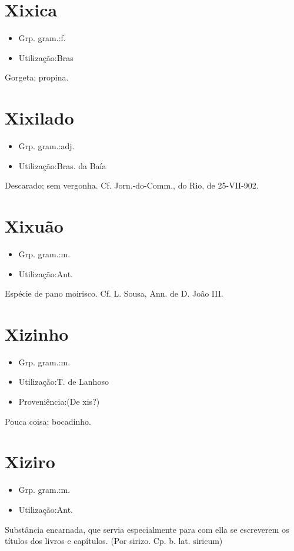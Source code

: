 \section{Xixica}
\begin{itemize}
\item {Grp. gram.:f.}
\end{itemize}
\begin{itemize}
\item {Utilização:Bras}
\end{itemize}
Gorgeta; propina.
\section{Xixilado}
\begin{itemize}
\item {Grp. gram.:adj.}
\end{itemize}
\begin{itemize}
\item {Utilização:Bras. da Baía}
\end{itemize}
Descarado; sem vergonha. Cf. \textunderscore Jorn.-do-Comm.\textunderscore , do Rio, de 25-VII-902.
\section{Xixuão}
\begin{itemize}
\item {Grp. gram.:m.}
\end{itemize}
\begin{itemize}
\item {Utilização:Ant.}
\end{itemize}
Espécie de pano moirisco. Cf. L. Sousa, \textunderscore Ann. de D. João III\textunderscore .
\section{Xizinho}
\begin{itemize}
\item {Grp. gram.:m.}
\end{itemize}
\begin{itemize}
\item {Utilização:T. de Lanhoso}
\end{itemize}
\begin{itemize}
\item {Proveniência:(De \textunderscore xis\textunderscore ?)}
\end{itemize}
Pouca coisa; bocadinho.
\section{Xiziro}
\begin{itemize}
\item {Grp. gram.:m.}
\end{itemize}
\begin{itemize}
\item {Utilização:Ant.}
\end{itemize}
Substância encarnada, que servia especialmente para com ella se escreverem os títulos dos livros e capítulos.
(Por \textunderscore sirizo\textunderscore . Cp. b. lat. \textunderscore siricum\textunderscore )
